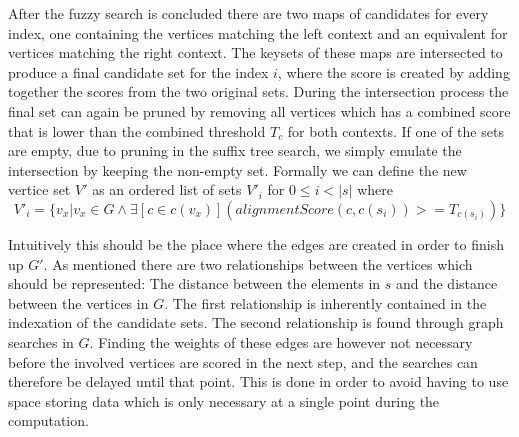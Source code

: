 \documentclass[thesis.tex]{subfiles}
\begin{document}
\par\noindent
After the fuzzy search is concluded there are two maps of candidates for every index, one containing the vertices matching the left context and an equivalent for vertices matching the right context. The keysets of these maps are intersected to produce a final candidate set for the index $i$, where the score is created by adding together the scores from the two original sets. During the intersection process the final set can again be pruned by removing all vertices which has a combined score that is lower than the combined threshold $T_c$ for both contexts. If one of the sets are empty, due to pruning in the suffix tree search, we simply emulate the intersection by keeping the non-empty set. Formally we can define the new vertice set $V'$ as an ordered list of sets $V'_i$ for $0 \leq i < |s|$ where
\begin{equation}
  V'_i=\{v_x|v_x \in G \land \exists [c \in c(v_x)](alignmentScore(c, c(s_i)) >= T_{c(s_i)})\}
\end{equation}
\par\noindent
Intuitively this should be the place where the edges are created in order to finish up $G'$. As mentioned there are two relationships between the vertices which should be represented: The distance between the elements in $s$ and the distance between the vertices in $G$. The first relationship is inherently contained in the indexation of the candidate sets. The second relationship is found through graph searches in $G$. Finding the weights of these edges are however not necessary before the involved vertices are scored in the next step, and the searches can therefore be delayed until that point. This is done in order to avoid having to use space storing data which is only necessary at a single point during the computation.
\end{document}
